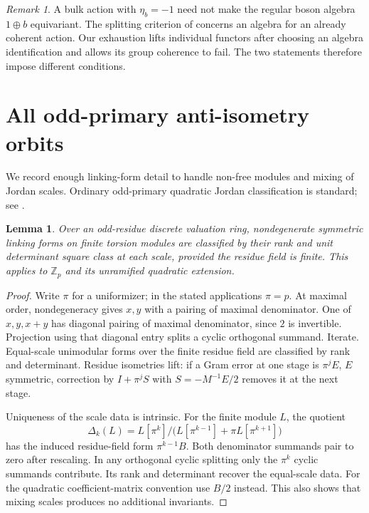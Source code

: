 \documentclass{amsart}
\newtheorem{lemma}[theorem]{Lemma}
\theoremstyle{definition}\newtheorem{definition}[theorem]{Definition}
\theoremstyle{remark}\newtheorem{remark}[theorem]{Remark}
\newcommand{\Z}{\mathbb Z}\newcommand{\Q}{\mathbb Q}
\begin{document}
\begin{remark}
A bulk action with $\eta_b=-1$ need not make the regular boson algebra
$1\oplus b$ equivariant. The splitting criterion of
\cite[Theorems 3.6--3.7]{BJLP} concerns an algebra for an already
coherent action. Our exhaustion lifts individual functors after choosing
an algebra identification and allows its group coherence to fail.
The two statements therefore impose different conditions.
\end{remark}

\section{All odd-primary anti-isometry orbits}\label{sec:arithmetic}

We record enough linking-form detail to handle non-free modules and
mixing of Jordan scales. Ordinary odd-primary quadratic Jordan
classification is standard; see \cite[Section 2]{Strom}.

\begin{lemma}\label{lem:linking}
Over an odd-residue discrete valuation ring, nondegenerate symmetric
linking forms on finite torsion modules are classified by their rank
and unit determinant square class at each scale, provided the residue
field is finite. This applies to $\Z_p$ and its unramified quadratic
extension.
\end{lemma}
\begin{proof}
Write $\pi$ for a uniformizer; in the stated applications $\pi=p$.
At maximal order, nondegeneracy gives $x,y$ with a pairing of maximal
denominator. One of $x,y,x+y$ has diagonal pairing of maximal
denominator, since $2$ is invertible. Projection using that diagonal
entry splits a cyclic orthogonal summand. Iterate.
Equal-scale unimodular forms over the finite residue field are
classified by rank and determinant. Residue isometries lift: if a
Gram error at one stage is $\pi^jE$, $E$ symmetric, correction by
$I+\pi^jS$ with $S=-M^{-1}E/2$ removes it at the next stage.

Uniqueness of the scale data is intrinsic. For the finite module $L$,
the quotient
\begin{equation}\label{eq:Delta}
 \Delta_k(L)=L[\pi^k]/\bigl(L[\pi^{k-1}]+\pi L[\pi^{k+1}]\bigr)
\end{equation}
has the induced residue-field form $\pi^{k-1}B$. Both denominator
summands pair to zero after rescaling. In any orthogonal cyclic
splitting only the $\pi^k$ cyclic summands contribute. Its rank and
determinant recover the equal-scale data. For the quadratic
coefficient-matrix convention use $B/2$ instead. This also shows
that mixing scales produces no additional invariants.
\end{proof}
\end{document}

